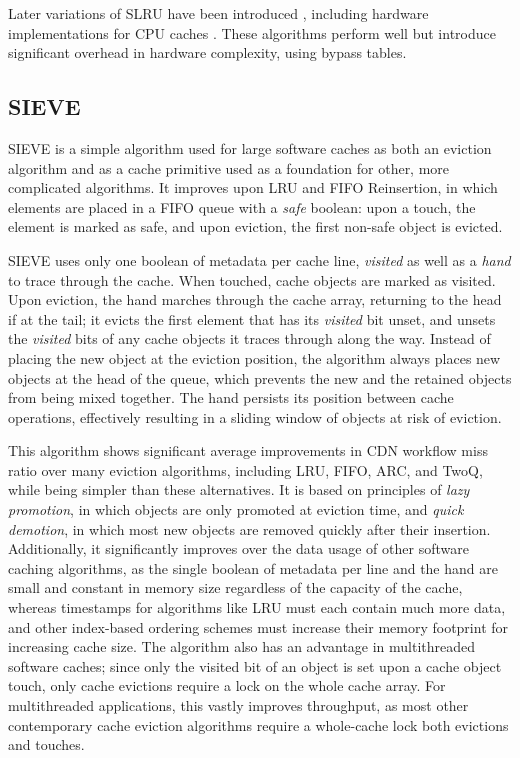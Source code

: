 \documentclass[letterpaper]{article}
\begin{document}
Later variations of SLRU have been introduced \cite{SSLRU},
including hardware implementations for CPU caches
\cite{DuelingSLRU}\cite{LimitedSLRU}\cite{FixedSLRU}\cite{FixedSLRUEnhancements}.
These algorithms perform well but introduce significant overhead in hardware complexity,
using bypass tables.

\subsection{SIEVE}

SIEVE is a simple algorithm used for large software caches as both an eviction algorithm
and as a cache primitive used as a foundation for other, more complicated algorithms. \cite{SIEVE}
It improves upon LRU and FIFO Reinsertion,
in which elements are placed in a FIFO queue with a \textit{safe} boolean:
upon a touch, the element is marked as safe, and upon eviction,
the first non-safe object is evicted.

SIEVE uses only one boolean of metadata per cache line, \textit{visited}
as well as a \textit{hand} to trace through the cache.
When touched, cache objects are marked as visited.
Upon eviction, the hand marches through the cache array, returning to the head if at the tail;
it evicts the first element that has its \textit{visited} bit unset,
and unsets the \textit{visited} bits of any cache objects it traces through along the way.
Instead of placing the new object at the eviction position,
the algorithm always places new objects at the head of the queue,
which prevents the new and the retained objects from being mixed together.
The hand persists its position between cache operations,
effectively resulting in a sliding window of objects at risk of eviction.

This algorithm shows significant average improvements in CDN workflow miss ratio
over many eviction algorithms,
including LRU, FIFO, ARC, and TwoQ, while being simpler than these alternatives.
It is based on principles of \textit{lazy promotion},
in which objects are only promoted at eviction time,
and \textit{quick demotion}, in which most new objects are removed quickly after their insertion.
Additionally, it significantly improves over the data usage of other
software caching algorithms, as the single boolean of metadata per line and the hand
are small and constant in memory size regardless of the capacity of the cache,
whereas timestamps for algorithms like LRU must each contain much more data,
and other index-based ordering schemes must increase their memory footprint for increasing cache size.
The algorithm also has an advantage in multithreaded software caches;
since only the visited bit of an object is set upon a cache object touch,
only cache evictions require a lock on the whole cache array.
For multithreaded applications, this vastly improves throughput,
as most other contemporary cache eviction algorithms require a whole-cache lock
both evictions and touches.
\end{document}
